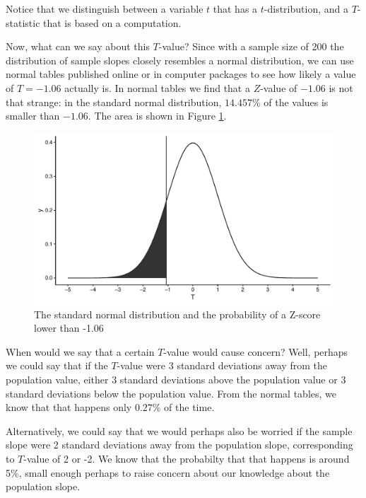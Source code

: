 \documentclass[]{book}\usepackage[]{graphicx}\usepackage[]{color}
\makeatletter
\def\maxwidth{ %
  \ifdim\Gin@nat@width>\linewidth
    \linewidth
  \else
    \Gin@nat@width
  \fi
}
\newenvironment{knitrout}{}{} %
\makeatother
\begin{document}
Notice that we distinguish between a variable $t$ that has a $t$-distribution, and a $T$-statistic that is based on a computation.


Now, what can we say about this $T$-value? Since with a sample size of 200 the distribution of sample slopes closely resembles a normal distribution, we can use normal tables published online or in computer packages to see how likely a value of $T=-1.06$ actually is. In normal tables we find that a $Z$-value of $-1.06$ is not that strange: in the standard normal distribution, $14.457$\% of the values is smaller than $-1.06$. The area is shown in Figure \ref{fig:inf_9b}.


\begin{knitrout}
\color{fgcolor}\begin{figure}

{\centering \includegraphics[width=\maxwidth]{figure/inf_9b-1} 

}

\caption[The standard normal distribution and the probability of a Z-score lower than -1.06]{The standard normal distribution and the probability of a Z-score lower than -1.06}\label{fig:inf_9b}
\end{figure}


\end{knitrout}


When would we say that a certain $T$-value would cause concern? Well, perhaps we could say that if the $T$-value were 3 standard deviations away from the population value, either 3 standard deviations above the population value or 3 standard deviations below the population value. From the normal tables, we know that that happens only $0.27$\% of the time.

Alternatively, we could say that we would perhaps also be worried if the sample slope were 2 standard deviations away from the population slope, corresponding to $T$-value of 2 or -2. We know that the probabilty that that happens is around 5\%, small enough perhaps to raise concern about our knowledge about the population slope.
\end{document}
